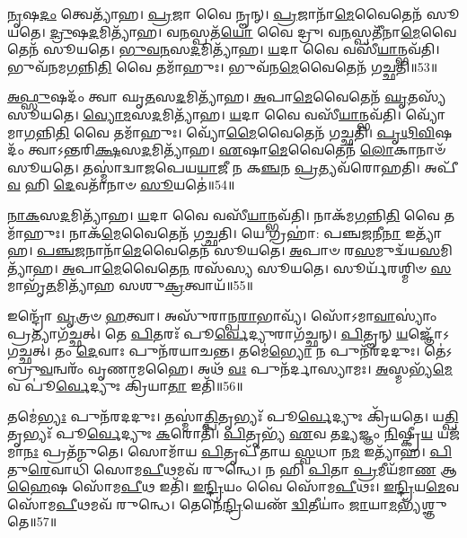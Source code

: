 \-\ul{𑌨𑍃}\-𑌷\-\ul{𑌦𑌂} 𑌤𑍍𑌵𑍇𑌤𑍍𑌯𑌾᳴𑌹।
\-\ul{𑌪𑍍𑌰}\-𑌜𑌾 𑌵𑍈 𑌨𑍄𑌨𑍍।
\-\ul{𑌪𑍍𑌰}\-𑌜𑌾𑌨𑌾᳴\-\ul{𑌮𑍇}\-𑌵𑍈𑌤𑍇𑌨᳴ 𑌸𑍂𑌯𑌤𑍇।
\-\ul{𑌦𑍍𑌰𑍁}\-𑌷\-\ul{𑌦}\-𑌮𑌿𑌤𑍍𑌯𑌾᳴𑌹।
𑌵\-\ul{𑌨}\-𑌸𑍍𑌪𑌤᳴\-\ul{𑌯𑍋} 𑌵𑍈 𑌦𑍍𑌰𑍁।
𑌵\-\ul{𑌨}\-𑌸𑍍𑌪𑌤𑍀᳴𑌨𑌾\-\ul{𑌮𑍇}\-𑌵𑍈𑌤𑍇𑌨᳴ 𑌸𑍂𑌯𑌤𑍇।
\-\ul{𑌭𑍁}\-\-\ul{𑌵}\-\-\ul{𑌨}\-𑌸\-\ul{𑌦}\-𑌮𑌿𑌤𑍍𑌯𑌾᳴𑌹।
\-\ul{𑌯}\-𑌦𑌾 𑌵𑍈 𑌵𑌸𑍀᳴\-\ul{𑌯𑌾}\-𑌨𑍍𑌭𑌵᳴𑌤𑌿।
𑌭𑍁𑌵᳴𑌨𑌮\-\ul{𑌗}\-𑌨𑍍𑌨𑌿\-\ul{𑌤𑌿} 𑌵𑍈 𑌤𑌮𑌾᳴𑌹𑍁𑌃।
𑌭𑍁𑌵᳴𑌨\-\ul{𑌮𑍇}\-𑌵𑍈𑌤𑍇𑌨᳴ 𑌗𑌚𑍍𑌛𑌤𑌿॥53॥

\-\ul{𑌅}\-\-\ul{𑌫𑍍𑌸𑍁}\-𑌷𑌦𑌂᳴ 𑌤𑍍𑌵𑌾 𑌘𑍃\-\ul{𑌤}\-𑌸\-\ul{𑌦}\-𑌮𑌿𑌤𑍍𑌯𑌾᳴𑌹।
\-\ul{𑌅}\-𑌪𑌾\-\ul{𑌮𑍇}\-𑌵𑍈𑌤𑍇𑌨᳴ \ul{𑌘𑍃}\-𑌤𑌸𑍍𑌯᳴ 𑌸𑍂𑌯𑌤𑍇।
\-\ul{𑌵𑍍𑌯𑍋}\-\-\ul{𑌮}\-𑌸\-\ul{𑌦}\-𑌮𑌿𑌤𑍍𑌯𑌾᳴𑌹।
\-\ul{𑌯}\-𑌦𑌾 𑌵𑍈 𑌵𑌸𑍀᳴\-\ul{𑌯𑌾}\-𑌨𑍍𑌭𑌵᳴𑌤𑌿।
𑌵𑍍𑌯𑍋᳴𑌮𑌾\-\ul{𑌗}\-𑌨𑍍𑌨𑌿\-\ul{𑌤𑌿} 𑌵𑍈 𑌤𑌮𑌾᳴𑌹𑍁𑌃।
𑌵𑍍𑌯𑍋᳴\-\ul{𑌮𑍈}\-𑌵𑍈𑌤𑍇𑌨᳴ 𑌗𑌚𑍍𑌛𑌤𑌿।
\-\ul{𑌪𑍃}\-\-\ul{𑌥𑌿}\-\-\ul{𑌵𑌿}\-𑌷𑌦𑌂᳴ 𑌤𑍍𑌵𑌾\-𑌽𑌨𑍍𑌤𑌰𑌿\-\ul{𑌕𑍍𑌷}\-𑌸\-\ul{𑌦}\-𑌮𑌿𑌤𑍍𑌯𑌾᳴𑌹।
\-\ul{𑌏}\-𑌷𑌾\-\ul{𑌮𑍇}\-𑌵𑍈𑌤𑍇𑌨᳴ \ul{𑌲𑍋}\-𑌕𑌾𑌨𑌾𑍞᳴ 𑌸𑍂𑌯𑌤𑍇।
𑌤𑌸𑍍𑌮𑌾॑𑌦𑍍𑌵𑌾𑌜𑌪𑍇𑌯\-\ul{𑌯𑌾}\-𑌜𑍀 𑌨 𑌕\-\ul{𑌞𑍍𑌚}\-𑌨 \ul{𑌪𑍍𑌰}\-𑌤𑍍𑌯𑌵᳴𑌰𑍋𑌹𑌤𑌿।
𑌅𑌪𑍀᳴\-\ul{𑌵} 𑌹𑌿 \ul{𑌦𑍇}\-𑌵𑌤𑌾᳴𑌨𑌾𑍞 \ul{𑌸𑍂}\-𑌯𑌤𑍇॑॥54॥

\-\ul{𑌨𑌾}\-\-\ul{𑌕}\-𑌸\-\ul{𑌦}\-𑌮𑌿𑌤𑍍𑌯𑌾᳴𑌹।
\-\ul{𑌯}\-𑌦𑌾 𑌵𑍈 𑌵𑌸𑍀᳴\-\ul{𑌯𑌾}\-𑌨𑍍𑌭𑌵᳴𑌤𑌿।
𑌨𑌾𑌕᳴𑌮\-\ul{𑌗}\-𑌨𑍍𑌨𑌿\-\ul{𑌤𑌿} 𑌵𑍈 𑌤𑌮𑌾᳴𑌹𑍁𑌃।
𑌨𑌾𑌕᳴\-\ul{𑌮𑍇}\-𑌵𑍈𑌤𑍇𑌨᳴ 𑌗𑌚𑍍𑌛𑌤𑌿।
𑌯𑍇 𑌗𑍍𑌰𑌹𑌾॑: 𑌪𑌞𑍍𑌚\-\ul{𑌜}\-𑌨𑍀\-\ul{𑌨𑌾} 𑌇𑌤𑍍𑌯𑌾᳴𑌹।
\-\ul{𑌪}\-\-\ul{𑌞𑍍𑌚}\-\-\ul{𑌜}\-𑌨𑌾𑌨𑌾᳴\-\ul{𑌮𑍇}\-𑌵𑍈𑌤𑍇𑌨᳴ 𑌸𑍂𑌯𑌤𑍇।
\-\ul{𑌅}\-𑌪𑌾𑍞 𑌰\-\ul{𑌸}\-𑌮𑍁𑌦𑍍𑌵᳴𑌯\-\ul{𑌸}\-𑌮𑌿\-𑌤𑍍𑌯𑌾᳴𑌹।
\-\ul{𑌅}\-𑌪𑌾\-\ul{𑌮𑍇}\-𑌵𑍈𑌤𑍇\-\ul{𑌨} 𑌰𑌸᳴𑌸𑍍𑌯 𑌸𑍂𑌯𑌤𑍇।
𑌸𑍂𑌰𑍍𑌯᳴𑌰𑌶𑍍𑌮𑌿𑍞 \ul{𑌸}\-𑌮𑌾𑌭𑍃᳴\-\ul{𑌤}\-𑌮𑌿𑌤𑍍𑌯𑌾᳴𑌹 𑌸𑌶𑍁\-\ul{𑌕𑍍𑌰}\-𑌤𑍍𑌵𑌾𑌯᳴॥55॥\anuvakamend[\-\ul{𑌗}\-\-\ul{𑌚𑍍𑌛}\-\-\ul{𑌤𑌿} \ul{𑌸𑍂}\-𑌯\-\ul{𑌤𑍇} 𑌨𑌵᳴ 𑌚]

𑌇𑌨𑍍𑌦𑍍𑌰𑍋᳴ \ul{𑌵𑍃}\-𑌤𑍍𑌰𑍞 \ul{𑌹}\-𑌤𑍍𑌵𑌾।
𑌅𑌸𑍁᳴𑌰𑌾𑌨𑍍𑌪\-\ul{𑌰𑌾}\-𑌭𑌾𑌵𑍍𑌯᳴।
𑌸𑍋᳴𑌽𑌮𑌾\-\ul{𑌵𑌾}\-𑌸𑍍𑌯𑌾𑌂॑ 𑌪𑍍𑌰𑌤𑍍𑌯𑌾𑌗᳴𑌚𑍍𑌛𑌤𑍍।
𑌤𑍇 \ul{𑌪𑌿}\-𑌤𑌰𑌃᳴ 𑌪𑍂\-\ul{𑌰𑍍𑌵𑍇}\-𑌦𑍍𑌯𑍁𑌰𑌾𑌗᳴𑌚𑍍𑌛𑌨𑍍।
\-\ul{𑌪𑌿}\-𑌤𑍄𑌨𑍍 \ul{𑌯}\-𑌜𑍍𑌞𑍋᳴\-𑌽𑌗𑌚𑍍𑌛𑌤𑍍।
𑌤𑌂 \ul{𑌦𑍇}\-𑌵𑌾𑌃 𑌪𑍁𑌨᳴𑌰𑌯𑌾𑌚𑌨𑍍𑌤।
𑌤𑌮𑍇॑\-\ul{𑌭𑍍𑌯𑍋} 𑌨 𑌪𑍁𑌨᳴𑌰𑌦𑌦𑍁𑌃।
𑌤𑍇॑𑌽𑌬𑍍𑌰𑍁\-\ul{𑌵}\-𑌨𑍍𑌵𑌰𑌂᳴ 𑌵𑍃𑌣𑌾𑌮𑌹𑍈।
𑌅𑌥᳴ \ul{𑌵𑌃} 𑌪𑍁𑌨᳴𑌰𑍍𑌦𑌾𑌸𑍍𑌯𑌾𑌮𑌃।
\-\ul{𑌅}\-𑌸𑍍𑌮𑌭𑍍𑌯᳴\-\ul{𑌮𑍇}\-𑌵 𑌪𑍂॑\-\ul{𑌰𑍍𑌵𑍇}\-𑌦𑍍𑌯𑍁𑌃 𑌕𑍍𑌰𑌿᳴𑌯𑌾\-\ul{𑌤𑌾} 𑌇𑌤𑌿᳴॥56॥

𑌤𑌮𑍇॑\-\ul{𑌭𑍍𑌯𑌃} 𑌪𑍁𑌨᳴𑌰𑌦𑌦𑍁𑌃।
𑌤𑌸𑍍𑌮𑌾॑\-\ul{𑌤𑍍𑌪𑌿}\-𑌤𑍃𑌭𑍍𑌯𑌃᳴ 𑌪𑍂\-\ul{𑌰𑍍𑌵𑍇}\-𑌦𑍍𑌯𑍁𑌃 𑌕𑍍𑌰𑌿᳴𑌯𑌤𑍇।
𑌯\-\ul{𑌤𑍍𑌪𑌿}\-𑌤𑍃𑌭𑍍𑌯𑌃᳴ 𑌪𑍂\-\ul{𑌰𑍍𑌵𑍇}\-𑌦𑍍𑌯𑍁𑌃 \ul{𑌕}\-𑌰𑍋𑌤𑌿᳴।
\-\ul{𑌪𑌿}\-𑌤𑍃𑌭𑍍𑌯᳴ \ul{𑌏}\-𑌵 𑌤\-\ul{𑌦𑍍𑌯}\-𑌜𑍍𑌞𑌂 \ul{𑌨𑌿}\-𑌷𑍍𑌕𑍍𑌰𑍀\-\ul{𑌯} 𑌯𑌜᳴𑌮𑌾\-\ul{𑌨𑌃} 𑌪𑍍𑌰𑌤᳴𑌨𑍁𑌤𑍇।
𑌸𑍋𑌮𑌾᳴𑌯 \ul{𑌪𑌿}\-𑌤𑍃𑌪𑍀᳴𑌤𑌾𑌯 \ul{𑌸𑍍𑌵}\-𑌧𑌾 𑌨\-\ul{𑌮} 𑌇𑌤𑍍𑌯𑌾᳴𑌹।
\-\ul{𑌪𑌿}\-𑌤𑍁\-\ul{𑌰𑍇}\-𑌵𑌾𑌧𑌿᳴ 𑌸𑍋𑌮\-\ul{𑌪𑍀}\-𑌥𑌮𑌵᳴ 𑌰𑍁𑌨𑍍𑌧𑍇।
𑌨 𑌹𑌿 \ul{𑌪𑌿}\-𑌤𑌾 \ul{𑌪𑍍𑌰}\-𑌮𑍀𑌯᳴𑌮𑌾\-\ul{𑌣} 𑌆\-\ul{𑌹𑍈}\-𑌷 𑌸𑍋᳴𑌮\-\ul{𑌪𑍀}\-𑌥 𑌇𑌤𑌿᳴।
\-\ul{𑌇}\-\-\ul{𑌨𑍍𑌦𑍍𑌰𑌿}\-𑌯𑌂 𑌵𑍈 𑌸𑍋᳴𑌮\-\ul{𑌪𑍀}\-𑌥𑌃।
\-\ul{𑌇}\-\-\ul{𑌨𑍍𑌦𑍍𑌰𑌿}\-𑌯\-\ul{𑌮𑍇}\-𑌵 𑌸𑍋᳴𑌮\-\ul{𑌪𑍀}\-𑌥𑌮𑌵᳴ 𑌰𑍁𑌨𑍍𑌧𑍇।
𑌤𑍇𑌨𑍇॑\-\ul{𑌨𑍍𑌦𑍍𑌰𑌿}\-𑌯𑍇𑌣᳴ \ul{𑌦𑍍𑌵𑌿}\-𑌤𑍀𑌯𑌾𑌂॑ \ul{𑌜𑌾}\-𑌯𑌾\-\ul{𑌮}\-𑌭𑍍𑌯᳴𑌶𑍍𑌞𑍁𑌤𑍇॥57॥

